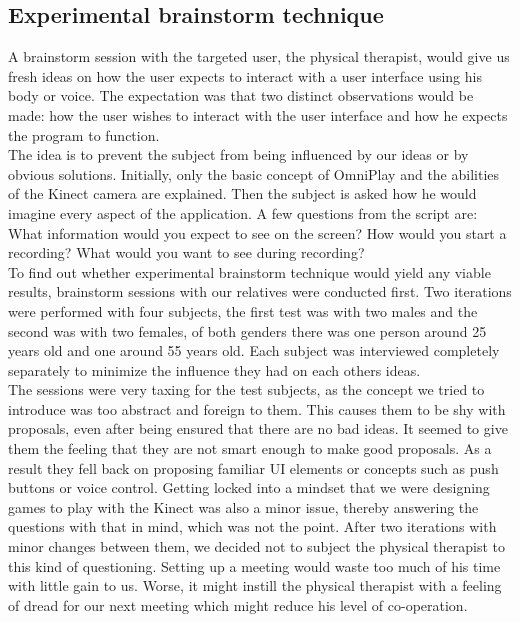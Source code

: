 \subsection{Experimental brainstorm technique}

A brainstorm session with the targeted user, the physical therapist, would give us fresh ideas on how the user expects to interact with a user interface using his body or voice. The expectation was that two distinct observations would be made: how the user wishes to interact with the user interface and how he expects the program to function.\\

The idea is to prevent the subject from being influenced by our ideas or by obvious solutions. Initially, only the basic concept of OmniPlay and the abilities of the Kinect camera are explained. Then the subject is asked how he would imagine every aspect of the application. A few questions from the script are: What information would you expect to see on the screen? How would you start a recording? What would you want to see during recording?\\

To find out whether experimental brainstorm technique would yield any viable results, brainstorm sessions with our relatives were conducted first. Two iterations were performed with four subjects, the first test was with two males and the second was with two females, of both genders there was one person around 25 years old and one around 55 years old. Each subject was interviewed completely separately to minimize the influence they had on each others ideas.\\

The sessions were very taxing for the test subjects, as the concept we tried to introduce was too abstract and foreign to them. This causes them to be shy with proposals, even after being ensured that there are no bad ideas. It seemed to give them the feeling that they are not smart enough to make good proposals. As a result they fell back on proposing familiar UI elements or concepts such as push buttons or voice control. Getting locked into a mindset that we were designing games to play with the Kinect was also a minor issue, thereby answering the questions with that in mind, which was not the point. After two iterations with minor changes between them, we decided not to subject the physical therapist to this kind of questioning. Setting up a meeting would waste too much of his time with little gain to us. Worse, it might instill the physical therapist with a feeling of dread for our next meeting which might reduce his level of co-operation.\\

